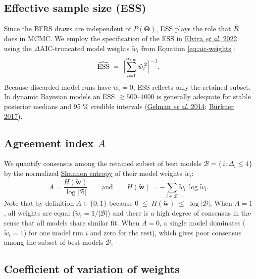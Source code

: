 \documentclass[
]{book}
\begin{document}
\subsection{Effective sample size (ESS)}\label{effective-sample-size-ess}

Since the BFRS draws are independent of \(P(\boldsymbol{\Theta})\), ESS plays
the role that \(\hat R\) does in MCMC. We employ the specification of the ESS in \href{https://onlinelibrary.wiley.com/doi/10.1111/insr.12500}{Elvira \emph{et al.} 2022} using the \(\Delta \text{AIC}\)-truncated model weights \(\tilde w_i\) from Equation \eqref{eq:aic-weights}:
\begin{equation}
\widehat{\text{ESS}}
\;=\;
\Bigl[
\sum_{i=1}^{n_{\text{sim}}} \tilde{w}_i^{\,2}
\Bigr]^{-1}.
\label{eq:ess}
\end{equation}
Because discarded model runs have \(\tilde{w}_i=0\), ESS reflects only the retained
subset. In dynamic Bayesian models an ESS \(\gtrsim\!500\)--\(1000\) is generally
adequate for stable posterior medians and 95 \% credible intervals
(\href{https://sites.stat.columbia.edu/gelman/book/}{Gelman \emph{et al.} 2014};
\href{https://www.jstatsoft.org/article/view/v080i01}{Bürkner 2017}).

\subsection{\texorpdfstring{Agreement index \(A\)}{Agreement index A}}\label{agreement-index-a}

We quantify consensus among the retained subset of best models \(\mathcal B = \{\,i : \Delta_i \le 4\}\) by the normalized \href{https://en.wikipedia.org/wiki/Entropy_(information_theory)}{Shannon entropy} of their model weights \(\tilde w_i\):
\begin{equation}
A = \frac{H(\mathbf{\tilde{w}})}{\log|\mathcal B|}
\qquad \text{and} \qquad
H(\mathbf{\tilde{w}})
=
-\sum_{i\in\mathcal B}\tilde w_i\,\log\tilde w_i.
\label{eq:agreement}
\end{equation}
Note that by definition \(A \in \{0,1\}\) because \(0 \;\le\; H(\mathbf{\tilde{w}})\;\le\;\log|\mathcal B|\). When \(A=1\), all weights are equal (\(\tilde w_i = 1/|\mathcal B|\)) and there is a high degree of consensus in the sense that all models share similar fit. When \(A=0\), a single model dominates (\(\tilde w_i = 1\)) for one model run \(i\) and zero for the rest), which gives poor consensus among the subset of best models \(\mathcal B\).

\subsection{Coefficient of variation of weights}\label{coefficient-of-variation-of-weights}
\end{document}
